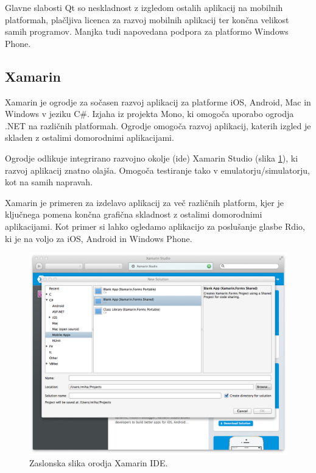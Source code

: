 Glavne slabosti Qt so neskladnost z izgledom ostalih aplikacij na mobilnih platformah, plačljiva licenca za razvoj mobilnih aplikacij ter končna velikost samih programov. Manjka tudi napovedana podpora za platformo Windows Phone.

\subsection{Xamarin}

Xamarin\cite{xamarin} je ogrodje za sočasen razvoj aplikacij za platforme iOS, Android, Mac in Windows v jeziku C\#. Izjaha iz projekta Mono\cite{mono}, ki omogoča uporabo ogrodja .NET\cite{dotnet} na različnih platformah. Ogrodje omogoča razvoj aplikacij, katerih izgled je skladen z ostalimi domorodnimi aplikacijami.

Ogrodje odlikuje integrirano razvojno okolje (\gls{ide}) Xamarin Studio (slika \ref{fig:xamarin}), ki razvoj aplikacij znatno olajša. Omogoča testiranje tako v emulatorju/simulatorju, kot na samih napravah.

Xamarin je primeren za izdelavo aplikacij za več različnih platform, kjer je ključnega pomena končna grafična skladnost z ostalimi domorodnimi aplikacijami. Kot primer si lahko ogledamo aplikacijo za poslušanje glasbe Rdio\cite{rdio}, ki je na voljo za iOS, Android in Windows Phone.

\begin{figure}
 \includegraphics[width=\linewidth]{xamarin}
 \caption{Zaslonska slika orodja Xamarin IDE.}
 \label{fig:xamarin}
\end{figure}


